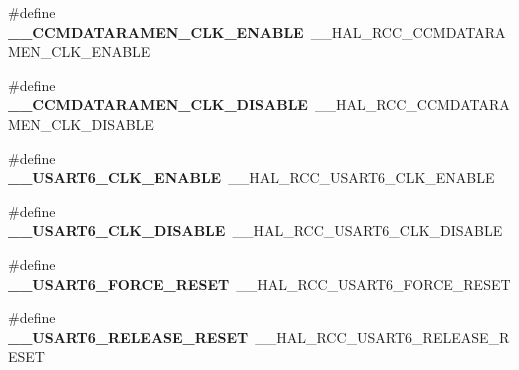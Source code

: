 \begin{DoxyCompactItemize}
\item 
\mbox{\label{group___h_a_l___r_c_c___aliased_gaa16691622e4f4f03061ab0c5778934dd}} 
\#define {\bfseries \+\_\+\+\_\+\+C\+C\+M\+D\+A\+T\+A\+R\+A\+M\+E\+N\+\_\+\+C\+L\+K\+\_\+\+E\+N\+A\+B\+LE}~\+\_\+\+\_\+\+H\+A\+L\+\_\+\+R\+C\+C\+\_\+\+C\+C\+M\+D\+A\+T\+A\+R\+A\+M\+E\+N\+\_\+\+C\+L\+K\+\_\+\+E\+N\+A\+B\+LE
\item 
\mbox{\label{group___h_a_l___r_c_c___aliased_ga25851169ddbfc457b597cfacc91173bd}} 
\#define {\bfseries \+\_\+\+\_\+\+C\+C\+M\+D\+A\+T\+A\+R\+A\+M\+E\+N\+\_\+\+C\+L\+K\+\_\+\+D\+I\+S\+A\+B\+LE}~\+\_\+\+\_\+\+H\+A\+L\+\_\+\+R\+C\+C\+\_\+\+C\+C\+M\+D\+A\+T\+A\+R\+A\+M\+E\+N\+\_\+\+C\+L\+K\+\_\+\+D\+I\+S\+A\+B\+LE
\item 
\mbox{\label{group___h_a_l___r_c_c___aliased_ga2dfc83c494279808ed47f7842f0a40e6}} 
\#define {\bfseries \+\_\+\+\_\+\+U\+S\+A\+R\+T6\+\_\+\+C\+L\+K\+\_\+\+E\+N\+A\+B\+LE}~\+\_\+\+\_\+\+H\+A\+L\+\_\+\+R\+C\+C\+\_\+\+U\+S\+A\+R\+T6\+\_\+\+C\+L\+K\+\_\+\+E\+N\+A\+B\+LE
\item 
\mbox{\label{group___h_a_l___r_c_c___aliased_ga0b5f454318d65779b4fcb8f415181852}} 
\#define {\bfseries \+\_\+\+\_\+\+U\+S\+A\+R\+T6\+\_\+\+C\+L\+K\+\_\+\+D\+I\+S\+A\+B\+LE}~\+\_\+\+\_\+\+H\+A\+L\+\_\+\+R\+C\+C\+\_\+\+U\+S\+A\+R\+T6\+\_\+\+C\+L\+K\+\_\+\+D\+I\+S\+A\+B\+LE
\item 
\mbox{\label{group___h_a_l___r_c_c___aliased_ga1a9db7963c878ef6018ff9bbc439e8ca}} 
\#define {\bfseries \+\_\+\+\_\+\+U\+S\+A\+R\+T6\+\_\+\+F\+O\+R\+C\+E\+\_\+\+R\+E\+S\+ET}~\+\_\+\+\_\+\+H\+A\+L\+\_\+\+R\+C\+C\+\_\+\+U\+S\+A\+R\+T6\+\_\+\+F\+O\+R\+C\+E\+\_\+\+R\+E\+S\+ET
\item 
\mbox{\label{group___h_a_l___r_c_c___aliased_ga78937fd5dc3a98a2aea8b54a276ab49a}} 
\#define {\bfseries \+\_\+\+\_\+\+U\+S\+A\+R\+T6\+\_\+\+R\+E\+L\+E\+A\+S\+E\+\_\+\+R\+E\+S\+ET}~\+\_\+\+\_\+\+H\+A\+L\+\_\+\+R\+C\+C\+\_\+\+U\+S\+A\+R\+T6\+\_\+\+R\+E\+L\+E\+A\+S\+E\+\_\+\+R\+E\+S\+ET
\item 
\mbox{\label{group___h_a_l___r_c_c___aliased_gaabd2ca8c095af0b15f7da6145c4bf5ee}} 

\end{DoxyCompactItemize}
